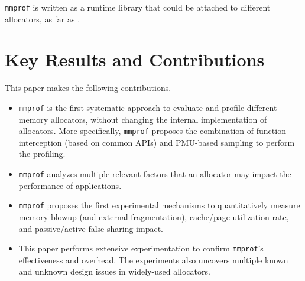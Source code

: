 \documentclass[pageno]{jpaper}
\newcommand{\MP}{\texttt{mmprof}}
\begin{document}

\noindent
\MP{} is written as a runtime library that could be attached to different allocators, as far as . 

\section{Key Results and Contributions}
\label{sec:key-contributions}

This paper makes the following contributions. 

\begin{itemize}
\item \MP{} is the first systematic approach to evaluate and profile different memory allocators, without changing the internal implementation of allocators. More specifically, \MP{} proposes the combination of function interception (based on common APIs) and PMU-based sampling to perform the profiling.
 

\item \MP{} analyzes multiple relevant factors that an allocator may impact the performance of applications.


\item \MP{} proposes the first experimental mechanisms to quantitatively measure memory blowup (and external fragmentation), cache/page utilization rate, and passive/active false sharing impact. 

\item This paper performs extensive experimentation to confirm \MP{}'s effectiveness and overhead. The experiments also uncovers multiple known and unknown design issues in widely-used allocators.  

\end{itemize} 
\end{document}
